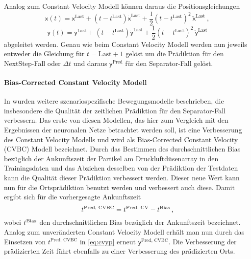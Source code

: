 Analog zum Constant Velocity Modell können daraus die Positionsgleichungen 
% 
\begin{equation*}
    \mathsf{x}(t) = \mathsf{x}^{\text{Last}} + (t - t^{\text{Last}})\dot{\mathsf{x}}^{\text{Last}} 
    + \frac{1}{2} (t - t^{\text{Last}})^2 \: \ddot{\mathsf{x}}^{\text{Last}} \: , 
\end{equation*}
\begin{equation*}
    \mathsf{y}(t) = \mathsf{y}^{\text{Last}} + (t - t^{\text{Last}})\dot{\mathsf{y}}^{\text{Last}}
    + \frac{1}{2} (t - t^{\text{Last}})^2 \: \ddot{\mathsf{y}}^{\text{Last}}
\end{equation*}
% 
abgeleitet werden.
Genau wie beim Constant Velocity Modell werden nun jeweils entweder die Gleichung für \(t = \text{Last} + 1\) gelöst 
um die Prädiktion für den NextStep-Fall oder \(\Delta t \) und daraus \(\mathsf{y}^{\text{Pred}}\) für den Separator-Fall gelöst.


\paragraph{Bias-Corrected Constant Velocity Modell}

In \cite{Pfaff2018} wurden weitere szenariospezifische Bewegungsmodelle beschrieben, die insbesondere die Qualität der zeitlichen Prädiktion für den Separator-Fall verbessern.
Das erste von diesen Modellen, das hier zum Vergleich mit den Ergebnissen der neuronalen Netze betrachtet werden soll, ist eine Verbesserung des Constant Velocity Modells und wird als Bias-Corrected Constant Velocity (CVBC) Modell bezeichnet.
Durch das Bestimmen des durchschnittlichen Bias bezüglich der Ankunftszeit der Partikel am Druckluftdüsenarray in den Trainingsdaten und das Abziehen desselben von der Prädiktion der Testdaten kann die Qualität dieser Prädiktion verbessert werden.
Dieser neue Wert kann nun für die Ortsprädiktion benutzt werden und verbessert auch diese.
Damit ergibt sich für die vorhergesagte Ankunftszeit
% 
\begin{equation*}
    t{^{\text{Pred, CVBC}}} = t{^{\text{Pred, CV}}} - t{^{\text{Bias}}} \, ,
\end{equation*}
% 
wobei \(t{^{\text{Bias}}}\) den durchschnittlichen Bias bezüglich der Ankunftszeit bezeichnet.
Analog zum unveränderten Constant Velocity Modell erhält man nun durch das Einsetzen von \(t^{\text{Pred, CVBC}}\) in \eqref{eq:cvyp} erneut \(\mathsf{y}^{\text{Pred, CVBC}}\).
Die Verbesserung der prädizierten Zeit führt ebenfalls zu einer Verbesserung des prädizierten Orts.



